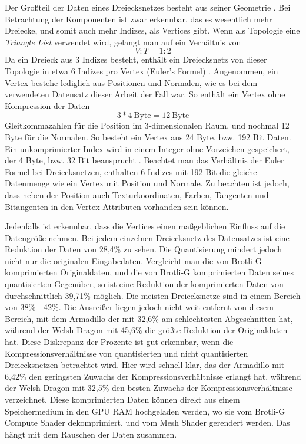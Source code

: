 Der Großteil der Daten eines Dreiecksnetzes besteht aus seiner Geometrie \cite{Jakob2017}.
Bei Betrachtung der Komponenten ist zwar erkennbar, das es wesentlich mehr Dreiecke, und somit auch mehr Indizes, als Vertices gibt.
Wenn als Topologie eine \textit{Triangle List} verwendet wird, gelangt man auf ein Verhältnis von 
\begin{equation*}
V:T = 1:2
\end{equation*}
Da ein Dreieck aus 3 Indizes besteht, enthält ein Dreiecksnetz von dieser Topologie in etwa 6 Indizes pro Vertex (Euler's Formel) \cite{Engstad2011}.
Angenommen, ein Vertex bestehe lediglich aus Positionen und Normalen, wie es bei dem verwendeten Datensatz dieser Arbeit der Fall war.
So enthält ein Vertex ohne Kompression der Daten
\begin{equation*}
3 * 4 \ \text{Byte} = 12 \ \text{Byte}
\end{equation*}
Gleitkommazahlen für die Position im 3-dimensionalen Raum, und nochmal 12 Byte für die Normalen.
So besteht ein Vertex aus 24 Byte, bzw. 192 Bit Daten.
Ein unkomprimierter Index wird in einem Integer ohne Vorzeichen gespeichert, der 4 Byte, bzw. 32 Bit beansprucht \cite{Microsoft2021a}. \newline
Beachtet man das Verhältnis der Euler Formel bei Dreiecksnetzen, enthalten 6 Indizes mit 192 Bit die gleiche Datenmenge wie ein Vertex mit Position und Normale.
Zu beachten ist jedoch, dass neben der Position auch Texturkoordinaten, Farben, Tangenten und Bitangenten in den Vertex Attributen vorhanden sein können. \newline

Jedenfalls ist erkennbar, dass die Vertices einen maßgeblichen Einfluss auf die Datengröße nehmen.
Bei jedem einzelnen Dreiecksnetz des Datensatzes ist eine Reduktion der Daten von 28,4\% zu sehen.
Die Quantisierung mindert jedoch nicht nur die originalen Eingabedaten.
Vergleicht man die von Brotli-G komprimierten Originaldaten, und die von Brotli-G komprimierten Daten seines quantisierten Gegenüber, so ist eine Reduktion der komprimierten Daten von durchschnittlich 39,71\% möglich.
Die meisten Dreiecksnetze sind in einem Bereich von 38\% - 42\%.
Die Ausreißer liegen jedoch nicht weit entfernt von diesem Bereich, mit dem Armadillo der mit 32,6\% am schlechtesten Abgeschnitten hat, während der Welsh Dragon mit 45,6\% die größte Reduktion der Originaldaten hat.
Diese Diskrepanz der Prozente ist gut erkennbar, wenn die Kompressionsverhältnisse von quantisierten und nicht quantisierten Dreiecksnetzen betrachtet wird.
Hier wird schnell klar, das der Armadillo mit 6,42\% den geringsten Zuwachs der Kompressionsverhältnisse erlangt hat, während der Welsh Dragon mit 32,5\% den besten Zuwachs der Kompressionsverhältnisse verzeichnet.
Diese komprimierten Daten können direkt aus einem Speichermedium in den GPU RAM hochgeladen werden, wo sie vom Brotli-G Compute Shader dekomprimiert, und vom Mesh Shader gerendert werden.
Das hängt mit dem Rauschen der Daten zusammen.

